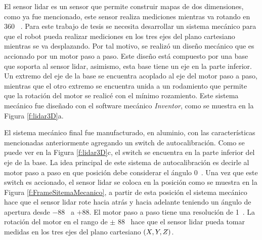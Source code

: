 
El sensor lidar es un sensor que permite construir mapas de dos dimensiones, como ya 
fue mencionado, este sensor realiza mediciones mientras va rotando en 360 \grad~. Para 
este trabajo de tesis se necesita desarrollar un sistema mecánico para que el robot 
pueda realizar mediciones en los tres ejes del plano cartesiano mientras se va 
desplazando. Por tal motivo, se realizó un diseño mecánico que es accionado por un motor
paso a paso. Este diseño está compuesto por una base que soporta al sensor lidar, asimismo, 
esta base tiene un eje en la parte inferior. Un extremo del eje de la base se encuentra 
acoplado al eje del motor paso a paso, mientras que el otro extremo se encuentra unida 
a un rodamiento que permite que la rotación del motor se realicé con el mínimo rozamiento. Este
sistema mecánico fue diseñado con el software mecánico \textit{Inventor}, como se muestra
en la Figura \ref{f:lidar3D}a.

El sistema mecánico final fue manufacturado, en aluminio, con las características mencionadas
anteriormente agregando un switch de autocalibración. Como se puede ver en la Figura 
\ref{f:lidar3D}c, el switch se encuentra en la parte inferior del eje de la base. La idea 
principal de este sistema de autocalibración es decirle al motor paso a paso en que posición 
debe considerar el ángulo 0\grad~. Una vez que este switch es accionado, el sensor lidar se 
coloca en la posición como se muestra en la Figura \ref{f:FrameSitemaMecanico}, a partir de esta 
posición el sistema mecánico hace que el sensor lidar rote hacia atrás y hacia adelante teniendo 
un ángulo de apertura desde $-88$\grad~ a $+88$\grad. El motor paso a paso tiene una resolución
de 1\grad~. La rotación del motor en el rango de $\pm$ 88\grad~ hace que el sensor lidar pueda 
tomar medidas en los tres ejes del plano cartesiano $(\mathnormal X,\mathnormal Y,\mathnormal Z)$.

